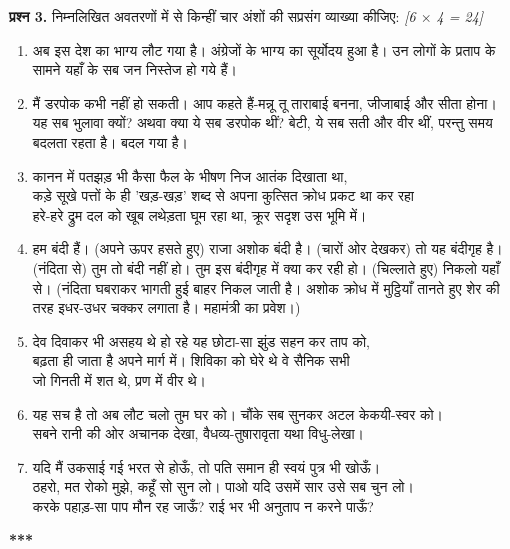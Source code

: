 \documentclass[11pt,a4paper]{article}
\newcommand{\pts}[1]{\hfill \textit{[#1]}}
\begin{document}
\bigskip

\noindent \textbf{प्रश्न 3.} निम्नलिखित अवतरणों में से किन्हीं चार अंशों की सप्रसंग व्याख्या कीजिए: \pts{6 $\times$ 4 = 24}
\begin{enumerate}[label=(\alph*)]
  \item अब इस देश का भाग्य लौट गया है। अंग्रेजों के भाग्य का सूर्योदय हुआ है। उन लोगों के प्रताप के सामने यहाँ के सब जन निस्तेज हो गये हैं।
  \item मैं डरपोक कभी नहीं हो सकती। आप कहते हैं-मन्नू तू ताराबाई बनना, जीजाबाई और सीता होना। यह सब भुलावा क्यों? अथवा क्या ये सब डरपोक थीं? बेटी, ये सब सती और वीर थीं, परन्तु समय बदलता रहता है। बदल गया है।
  \item कानन में पतझड़ भी कैसा फैल के भीषण निज आतंक दिखाता था,\\
  कड़े सूखे पत्तों के ही 'खड़-खड़' शब्द से अपना कुत्सित क्रोध प्रकट था कर रहा\\
  हरे-हरे द्रुम दल को खूब लथेड़ता घूम रहा था, क्रूर सदृश उस भूमि में।
  \item हम बंदी हैं। (अपने ऊपर हसते हुए) राजा अशोक बंदी है। (चारों ओर देखकर) तो यह बंदीगृह है। (नंदिता से) तुम तो बंदी नहीं हो। तुम इस बंदीगृह में क्या कर रही हो। (चिल्लाते हुए) निकलो यहाँ से। (नंदिता घबराकर भागती हुई बाहर निकल जाती है। अशोक क्रोध में मुट्ठियाँ तानते हुए शेर की तरह इधर-उधर चक्कर लगाता है। महामंत्री का प्रवेश।)
  \item देव दिवाकर भी असहय थे हो रहे यह छोटा-सा झुंड सहन कर ताप को,\\
  बढ़ता ही जाता है अपने मार्ग में। शिविका को घेरे थे वे सैनिक सभी\\
  जो गिनती में शत थे, प्रण में वीर थे।
  \item यह सच है तो अब लौट चलो तुम घर को। चौंके सब सुनकर अटल केकयी-स्वर को।\\
  सबने रानी की ओर अचानक देखा, वैधव्य-तुषारावृता यथा विधु-लेखा।
  \item यदि मैं उकसाई गई भरत से होऊँ, तो पति समान ही स्वयं पुत्र भी खोऊँ।\\
  ठहरो, मत रोको मुझे, कहूँ सो सुन लो। पाओ यदि उसमें सार उसे सब चुन लो।\\
  करके पहाड़-सा पाप मौन रह जाऊँ? राई भर भी अनुताप न करने पाऊँ?
\end{enumerate}

\bigskip
\begin{center}
  \textbf{***}
\end{center}
\end{document}
